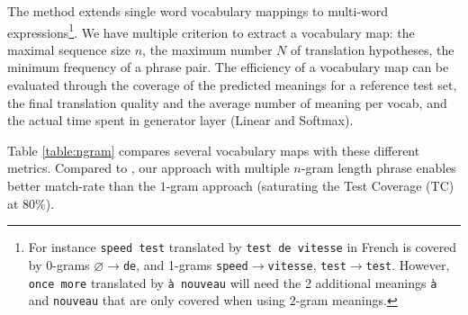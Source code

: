 \documentclass[11pt,a4paper]{article}
\begin{document}
The method extends single word vocabulary mappings to multi-word expressions\footnote{For instance {\tt speed test} translated by {\tt test de vitesse} in French is covered by 0-grams {\tt $\varnothing\rightarrow$de}, and 1-grams {\tt speed$\rightarrow$vitesse}, {\tt test$\rightarrow$test}. However, {\tt once more} translated by {\tt \`a nouveau} will need the 2 additional meanings {\tt \`{a} } and {\tt nouveau} that are only covered when using $2$-gram meanings.}.  We have multiple criterion to extract a vocabulary map: the maximal sequence size $n$, the maximum number $N$ of translation hypotheses, the minimum frequency of a phrase pair. The efficiency of a vocabulary map can be evaluated through the coverage of the predicted meanings for a reference test set, the final translation quality and the average number of meaning per vocab, and the actual time spent in generator layer (Linear and Softmax).

Table \ref{table:ngram} compares several vocabulary maps with these
different metrics. Compared to , our approach
with multiple $n$-gram length phrase enables better match-rate than the
$1$-gram approach (saturating the Test Coverage (TC) at 80\%).
\end{document}
